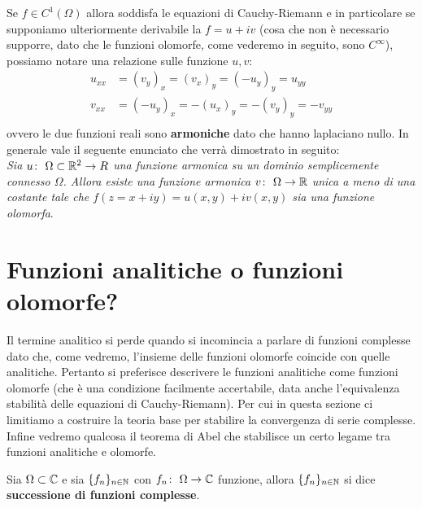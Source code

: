 \begin{remark}
	Se $f \in C^1(\Omega)$ allora soddisfa le equazioni di Cauchy-Riemann e in particolare se supponiamo ulteriormente derivabile la $f = u+iv$ (cosa che non è necessario supporre, dato che le funzioni olomorfe, come vederemo in seguito, sono $C^\infty$), possiamo notare una relazione sulle funzione $u,v$:
	\begin{equation}
	\begin{aligned}	
		u_{xx} & = (v_y)_x = (v_x)_y = (-u_y)_y = u_{yy} \\
		v_{xx} & = (-u_y)_x = -(u_x)_y = -(v_y)_y = -v_{yy}\\
	\end{aligned}
	\end{equation}
	ovvero le due funzioni reali sono \textbf{armoniche} dato che hanno laplaciano nullo. In generale vale il seguente enunciato che verrà dimostrato in seguito:\\
	
	\textit{Sia $u \colon\ \Omega \subset \mathbb{R}^2 \rightarrow R$ una funzione armonica su un dominio semplicemente connesso $\Omega$. Allora esiste una funzione armonica $v \colon\ \Omega \rightarrow \mathbb{R}$ unica a meno di una costante tale che $f(z=x+iy) = u(x,y) + iv(x,y)$ sia una funzione olomorfa}.
\end{remark}		
	
\section{Funzioni analitiche o funzioni olomorfe?}

Il termine analitico si perde quando si incomincia a parlare di funzioni complesse dato che, come vedremo, l'insieme delle funzioni olomorfe coincide con quelle analitiche. Pertanto si preferisce descrivere le funzioni analitiche come funzioni olomorfe (che è una condizione facilmente accertabile, data anche l'equivalenza stabilità delle equazioni di Cauchy-Riemann). Per cui in questa sezione ci limitiamo a costruire la teoria base per stabilire la convergenza di serie complesse. Infine vedremo qualcosa il teorema di Abel che stabilisce un certo legame tra funzioni analitiche e olomorfe.\\

\begin{definition}
	\label{defn:successione-di-funzioni-complesse}
	Sia $\Omega \subset \mathbb{C}$ e sia $\{f_n\}_{n\in\mathbb{N}}$ con $f_n \colon\ \Omega \rightarrow \mathbb{C}$ funzione, allora $\{f_n\}_{n\in\mathbb{N}}$ si dice \textbf{successione di funzioni complesse}.
\end{definition}

